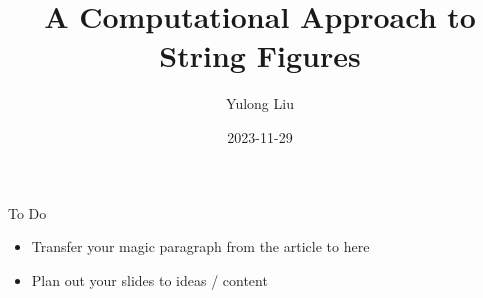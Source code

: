 \documentclass{!beamer}
\title{A Computational Approach to String Figures}
\date{2023-11-29}
\author{Yulong Liu}
\begin{document}
\maketitle

% 
% 


\begin{frame}{To Do}
\begin{itemize}
    \item Transfer your magic paragraph from the article to here
    \item Plan out your slides to ideas / content
\end{itemize}
\end{frame}

\end{document}
